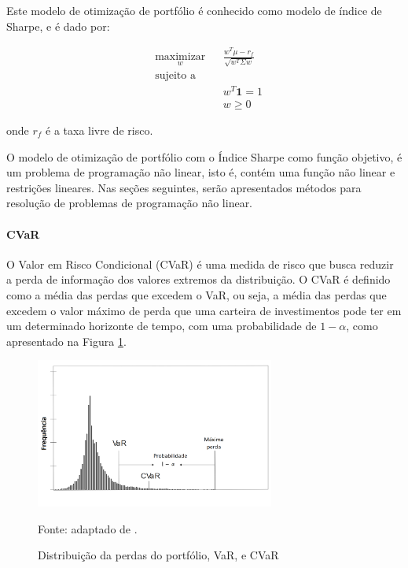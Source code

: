                     \ipar Este modelo de otimização de portfólio é conhecido como modelo de índice de Sharpe, e é dado por:

                    \begin{equation}
                        \label{eq:sharpe}
                        \begin{aligned}
                            & \underset{w}{\text{maximizar}}
                            & & \frac{w^T \mu - r_f}{\sqrt{w^T \Sigma w}} \\
                            & \text{sujeito a} \\
                            & & & w^T \mathbf{1} = 1 \\
                            & & & w \geq 0
                        \end{aligned}
                    \end{equation}

                    \noindent onde $r_f$ é a taxa livre de risco.

                    \ipar O modelo de otimização de portfólio com o Índice Sharpe como função objetivo, é um problema de programação não linear, isto é, contém uma função não linear e restrições lineares. Nas seções seguintes, serão apresentados métodos para resolução de problemas de programação não linear.
                

                    \paragraph{\acrshort{CVaR}}

                  
                    \ipar O Valor em Risco Condicional (\acrshort{CVaR}) é uma medida de risco que busca reduzir a perda de informação dos valores extremos da distribuição. O \acrshort{CVaR} é definido como a média das perdas que excedem o \acrshort{VaR}, ou seja, a média das perdas que excedem o valor máximo de perda que uma carteira de investimentos pode ter em um determinado horizonte de tempo, com uma probabilidade de $1-\alpha$, como apresentado na Figura \ref{fig:CVaR}.
    
    
                    \begin{figure}[htp]
                        \centering
                        \caption{Distribuição da perdas do portfólio, VaR, e CVaR}
                        \label{fig:CVaR}
                        \includegraphics[width=0.7\textwidth]{./imagens/CVaR.png}
                        \par \footnotesize Fonte: adaptado de .
                    \end{figure}
    
